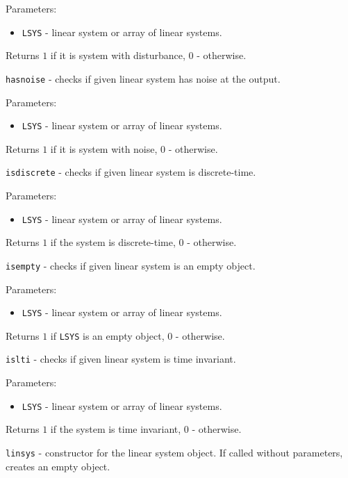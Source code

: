 \documentclass{report}
\begin{document}
Parameters:
\begin{itemize}
\item {\tt LSYS} - linear system or array of linear systems.
\end{itemize}

Returns $1$ if it is system with disturbance, $0$ - otherwise.

\newpage

{\Large {\tt hasnoise}} - checks if given linear system has noise at the
output.

Parameters:
\begin{itemize}
\item {\tt LSYS} - linear system or array of linear systems.
\end{itemize}

Returns $1$ if it is system with noise, $0$ - otherwise.

\newpage

{\Large {\tt isdiscrete}} - checks if given linear system is discrete-time.

Parameters:
\begin{itemize}
\item {\tt LSYS} - linear system or array of linear systems.
\end{itemize}

Returns $1$ if the system is discrete-time, $0$ - otherwise.

\newpage

{\Large {\tt isempty}} - checks if given linear system is an empty object.

Parameters:
\begin{itemize}
\item {\tt LSYS} - linear system or array of linear systems.
\end{itemize}

Returns $1$ if {\tt LSYS} is an empty object, $0$ - otherwise.

\newpage

{\Large {\tt islti}} - checks if given linear system is time invariant.

Parameters:
\begin{itemize}
\item {\tt LSYS} - linear system or array of linear systems.
\end{itemize}

Returns $1$ if the system is time invariant, $0$ - otherwise.

\newpage

{\Large {\tt linsys}} - constructor for the linear system object.
If called without parameters, creates an empty object.
\end{document}
